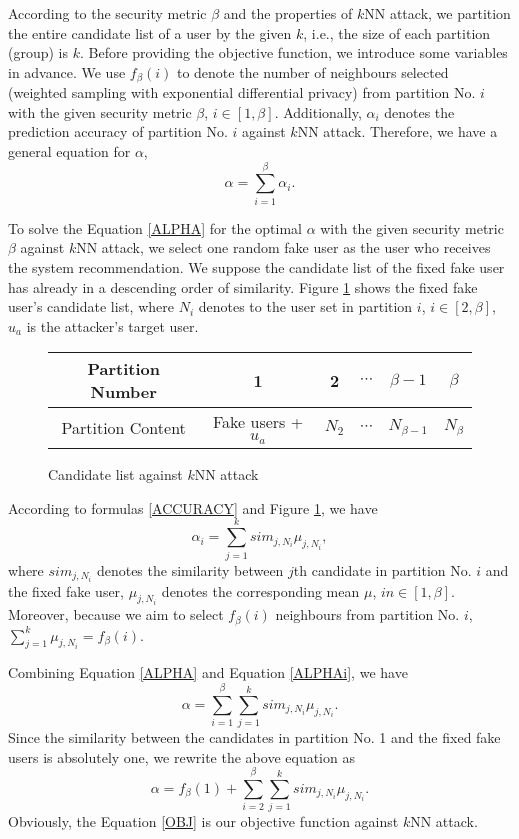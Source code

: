 \documentclass[11pt]{article}
\begin{document}
According to the security metric $\beta$ and the properties of $k$NN attack, we partition the entire candidate list of a user by the given $k$, i.e., the size of each partition (group) is $k$. Before providing the objective function, we introduce some variables in advance. We use $f_{\beta}(i)$ to denote the number of neighbours selected (weighted sampling with exponential differential privacy) from partition No. $i$ with the given security metric $\beta$, $i \in [1,\beta]$. Additionally, $\alpha_i$ denotes the prediction accuracy of partition No. $i$ against $k$NN attack. Therefore, we have a general equation for $\alpha$,
\begin{equation}
\label{ALPHA}
\alpha = \sum_{i=1}^{\beta}{\alpha_i}.
\end{equation}

To solve the Equation \eqref{ALPHA} for the optimal $\alpha$ with the given security metric $\beta$ against $k$NN attack, we select one random fake user as the user who receives the system recommendation. We suppose the candidate list of the fixed fake user has already in a descending order of similarity. Figure \ref{fig:1kNN} shows the fixed fake user's candidate list, where $N_i$ denotes to the user set in partition $i$, $i \in [2, \beta]$, $u_a$ is the attacker's target user.
\begin{figure}[!h]
\centering
\begin{tabular}{|c|c|c|c|c|c|}
\hline 
Partition Number & 1 & 2 & $\cdots$ & $\beta-1$ & $\beta$\tabularnewline
\hline 
Partition Content & Fake users + $u_a$ & $N_{2}$ & $\cdots$ & $N_{\beta-1}$ & $N_{\beta}$\tabularnewline
\hline 
\end{tabular}
\caption{Candidate list against $k$NN attack}
\label{fig:1kNN}
\end{figure}

According to formulas \eqref{ACCURACY} and Figure \ref{fig:1kNN}, we have
\begin{equation}
\label{ALPHAi}
\alpha_i = \sum_{j=1}^{k}{sim_{j,N_i}\mu_{j,N_i}},
\end{equation}
where $sim_{j,N_i}$ denotes the similarity between $j$th candidate in partition No. $i$ and the fixed fake user, $\mu_{j,N_i}$ denotes the corresponding mean $\mu$, $in \in [1,\beta]$. Moreover, because we aim to select $f_{\beta}(i)$ neighbours from partition No. $i$, $\sum_{j=1}^{k}{\mu_{j,N_i}}=f_{\beta}(i)$.

Combining Equation \eqref{ALPHA} and Equation \eqref{ALPHAi}, we have 
\begin{equation}
\alpha = \sum_{i=1}^{\beta}{\sum_{j=1}^{k}{sim_{j,N_i}\mu_{j,N_i}}}.
\end{equation}
Since the similarity between the candidates in partition No. 1 and the fixed fake users is absolutely one, we rewrite the above equation as
\begin{equation}
\label{OBJ}
\alpha = f_{\beta}(1) + \sum_{i=2}^{\beta}{\sum_{j=1}^{k}{sim_{j,N_i}\mu_{j,N_i}}}.
\end{equation}
Obviously, the Equation \eqref{OBJ} is our objective function against $k$NN attack.
\end{document}
